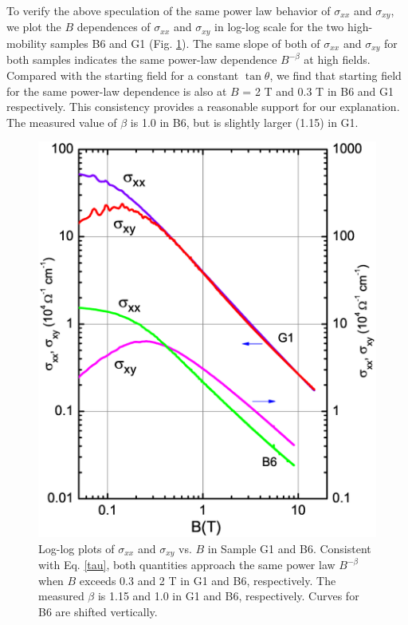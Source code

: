 To verify the above speculation of the same power law behavior of $\sigma_{xx}$ and $\sigma_{xy}$, we plot the $B$ dependences of $\sigma_{xx}$ and $\sigma_{xy}$ in log-log scale for the two high-mobility samples B6 and G1 (Fig. \ref{figCond}). The same slope of both of $\sigma_{xx}$ and $\sigma_{xy}$ for both samples indicates the same power-law dependence $B^{-\beta}$ at high fields. Compared with the starting field for a constant $\tan\theta$, we find that starting field for the same power-law dependence is also at $B$ = 2 T and 0.3 T in B6 and G1 respectively. This consistency provides a reasonable support for our explanation. The measured value of $\beta$ is 1.0 in B6, but is slightly larger (1.15) in G1. 

\begin{figure}[!htbp]
  \begin{center}
\includegraphics[width=0.8\linewidth]{ch-na3bi/figures/FigLogSigxy}
\caption{\label{figCond} 
Log-log plots of $\sigma_{xx}$ and $\sigma_{xy}$ vs. $B$ in Sample G1 and B6. Consistent with Eq. \ref{tau}, both quantities approach the same power law $B^{-\beta}$ when $B$ exceeds 0.3 and 2 T in G1 and B6, respectively. The measured $\beta$ is 1.15 and 1.0 in G1 and B6, respectively. Curves for B6 are shifted vertically.
}
  \end{center}
\end{figure}

